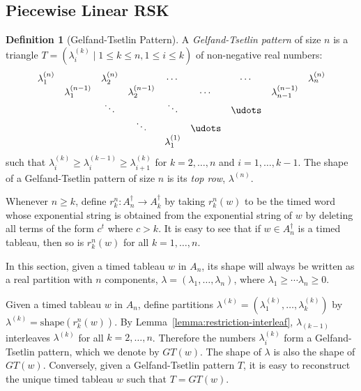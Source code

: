 \documentclass[10pt]{amsproc}
\theoremstyle{definition}
\newtheorem{definition}[theorem]{Definition}
\theoremstyle{remark}
\newcommand{\shape}{\mathrm{shape}}
\begin{document}
\subsection{Piecewise Linear RSK}
\label{sec:piecewise-linear-rsk}
\begin{definition}
  [Gelfand-Tsetlin Pattern]
  A \emph{Gelfand-Tsetlin pattern} of size $n$ is a triangle $T=(\lambda^{(k)}_i\mid 1\leq k \leq n, 1\leq i \leq k)$ of non-negative real numbers:
  \begin{displaymath}
    \begin{matrix}
      \lambda^{(n)}_1 & & \lambda^{(n)}_2 && \dotsb && \dotsb && \lambda^{(n)}_n\\
      &\lambda^{(n-1)}_1 && \lambda^{(n-1)}_2 && \dotsb && \lambda^{(n-1)}_{n-1} & \\
      && \ddots && \ddots && \udots &&  \\
      &&& \ddots && \udots &&&\\
      &&&& \lambda^{(1)}_1 &&&&
    \end{matrix}
  \end{displaymath}
  such that $\lambda^{(k)}_i\geq \lambda^{(k-1)}_i\geq \lambda^{(k)}_{i+1}$ for $k=2,\dotsc,n$ and $i=1,\dotsc, k-1$.
  The shape of a Gelfand-Tsetlin pattern of size $n$ is its \emph{top row}, $\lambda^{(n)}$.
\end{definition}
Whenever $n\geq k$, define $r^n_k:A_n^\dagger\to A_k^\dagger$ by taking $r^n_k(w)$ to be the timed word whose exponential string is obtained from the exponential string of $w$ by deleting all terms of the form $c^t$ where $c>k$.
It is easy to see that if $w\in A_n^\dagger$ is a timed tableau, then so is $r^n_k(w)$ for all $k=1,\dotsc,n$.

In this section, given a timed tableau $w$ in $A_n$, its shape will always be written as a real partition with $n$ components, $\lambda=(\lambda_1,\dotsc,\lambda_n)$, where $\lambda_1\geq \dotsb \lambda_n\geq 0$.

Given a timed tableau $w$ in $A_n$, define partitions $\lambda^{(k)}=(\lambda^{(k)}_1,\dotsc,\lambda^{(k)}_k)$ by $\lambda^{(k)} = \shape(r^n_k(w))$.
By Lemma~\ref{lemma:restriction-interleaf}, $\lambda_{(k-1)}$ interleaves $\lambda^{(k)}$ for all $k=2,\dotsc,n$.
Therefore the numbers $\lambda^{(k)}_i$ form a Gelfand-Tsetlin pattern, which we denote by $GT(w)$.
The shape of $\lambda$ is also the shape of $GT(w)$.
Conversely, given a Gelfand-Tsetlin pattern $T$, it is easy to reconstruct the unique timed tableau $w$ such that $T=GT(w)$.
\end{document}
